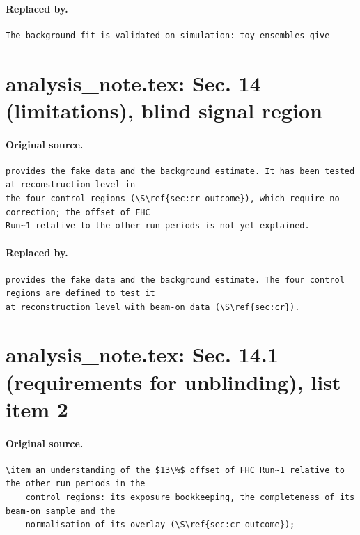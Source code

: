 \documentclass[11pt,a4paper]{article}
\begin{document}
\paragraph{Replaced by.}
\begin{lstlisting}[language={[LaTeX]TeX},basicstyle=\ttfamily\footnotesize,columns=fullflexible]
The background fit is validated on simulation: toy ensembles give
\end{lstlisting}

\section{analysis\_note.tex: Sec. 14 (limitations), blind signal region}
\paragraph{Original source.}
\begin{lstlisting}[language={[LaTeX]TeX},basicstyle=\ttfamily\footnotesize,columns=fullflexible]
provides the fake data and the background estimate. It has been tested at reconstruction level in
the four control regions (\S\ref{sec:cr_outcome}), which require no correction; the offset of FHC
Run~1 relative to the other run periods is not yet explained.
\end{lstlisting}
\paragraph{Replaced by.}
\begin{lstlisting}[language={[LaTeX]TeX},basicstyle=\ttfamily\footnotesize,columns=fullflexible]
provides the fake data and the background estimate. The four control regions are defined to test it
at reconstruction level with beam-on data (\S\ref{sec:cr}).
\end{lstlisting}

\section{analysis\_note.tex: Sec. 14.1 (requirements for unblinding), list item 2}
\paragraph{Original source.}
\begin{lstlisting}[language={[LaTeX]TeX},basicstyle=\ttfamily\footnotesize,columns=fullflexible]
  \item an understanding of the $13\%$ offset of FHC Run~1 relative to the other run periods in the
    control regions: its exposure bookkeeping, the completeness of its beam-on sample and the
    normalisation of its overlay (\S\ref{sec:cr_outcome});
\end{lstlisting}
\end{document}
